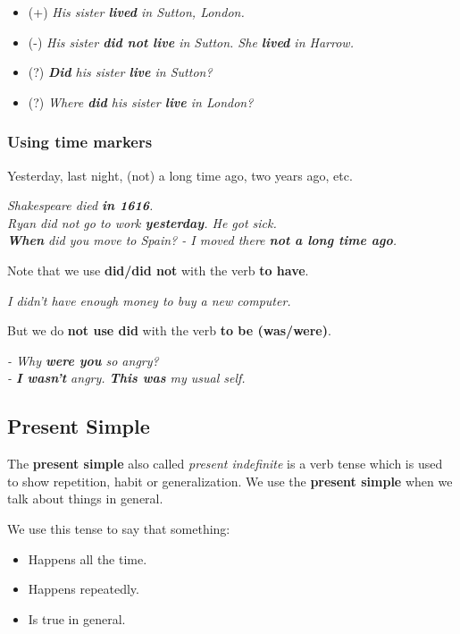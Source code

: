 \documentclass[hidelinks,10pt,a4paper]{article}
\begin{document}
\begin{itemize}
	\item (+) \textit{His sister \textbf{lived} in Sutton, London.}
	\item (-) \textit{His sister \textbf{did not live} in Sutton. She \textbf{lived} in Harrow. }
	\item (?) \textit{ \textbf{Did} his sister \textbf{live} in Sutton?  }
	\item (?) \textit{Where \textbf{did} his sister \textbf{live} in London?}
\end{itemize}

\subsubsection{Using time markers}

Yesterday, last night, (not) a long time ago, two years ago, etc.

\begin{center}
	\textit{Shakespeare died \textbf{in 1616}.\\
	Ryan did not go to work \textbf{yesterday}. He got sick. \\
	\textbf{When} did you move to Spain? - I moved there \textbf{not a long time ago}. }
\end{center}

Note that we use \textbf{did/did not} with the verb \textbf{to have}.

\begin{center}
	\textit{I didn't have enough money to buy a new computer.}
\end{center}

But we do \textbf{not use did} with the verb \textbf{to be (was/were)}.

\begin{center}
	\textit{- Why \textbf{were you} so angry? \\
	- \textbf{I wasn't} angry. \textbf{This was} my usual self.}
\end{center}

\subsection{Present Simple}
The \textbf{present simple} also called \textit{present indefinite} is a verb tense which is used to show repetition, habit or generalization. We use the \textbf{present simple} when we talk about things in general.

We use this tense to say that something:
\begin{itemize}
	\item Happens all the time.
	\item Happens repeatedly.
	\item Is true in general.
\end{itemize}
\end{document}
